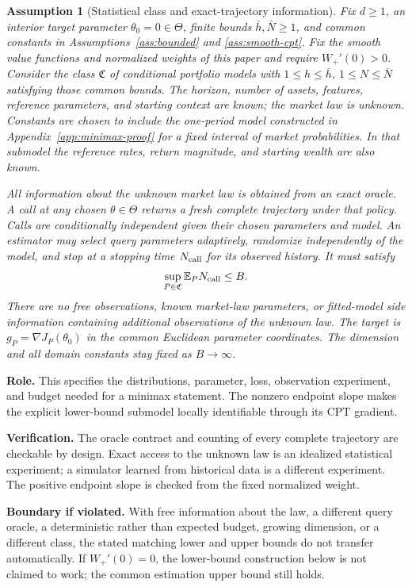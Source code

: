 \documentclass[11pt]{article}
\newtheorem{assumption}[theorem]{Assumption}
\newcommand{\E}{\mathbb E}
\newcommand{\1}{\mathbf 1}
\theoremstyle{definition}
\newcommand{\assess}[3]{\par\noindent\textbf{Role.} #1\par\noindent\textbf{Verification.} #2\par\noindent\textbf{Boundary if violated.} #3\par\medskip}
\begin{document}
\begin{assumption}[Statistical class and exact-trajectory information]\label{ass:oracle}
Fix $d\ge1$, an interior target parameter $\theta_0=0\in\Theta$, finite bounds $\bar h,\bar N\ge1$, and common constants in Assumptions~\ref{ass:bounded} and \ref{ass:smooth-cpt}. Fix the smooth value functions and normalized weights of this paper and require $W_+'(0)>0$. Consider the class $\mathfrak C$ of conditional portfolio models with $1\le h\le\bar h$, $1\le N\le\bar N$ satisfying those common bounds. The horizon, number of assets, features, reference parameters, and starting context are known; the market law is unknown. Constants are chosen to include the one-period model constructed in Appendix~\ref{app:minimax-proof} for a fixed interval of market probabilities. In that submodel the reference rates, return magnitude, and starting wealth are also known.

All information about the unknown market law is obtained from an exact oracle. A call at any chosen $\theta\in\Theta$ returns a fresh complete trajectory under that policy. Calls are conditionally independent given their chosen parameters and model. An estimator may select query parameters adaptively, randomize independently of the model, and stop at a stopping time $N_{\rm call}$ for its observed history. It must satisfy
\[
 \sup_{P\in\mathfrak C}\E_P N_{\rm call}\le B.
\]
There are no free observations, known market-law parameters, or fitted-model side information containing additional observations of the unknown law. The target is $g_P=\nabla J_P(\theta_0)$ in the common Euclidean parameter coordinates. The dimension and all domain constants stay fixed as $B\to\infty$.
\end{assumption}
\assess{This specifies the distributions, parameter, loss, observation experiment, and budget needed for a minimax statement. The nonzero endpoint slope makes the explicit lower-bound submodel locally identifiable through its CPT gradient.}{The oracle contract and counting of every complete trajectory are checkable by design. Exact access to the unknown law is an idealized statistical experiment; a simulator learned from historical data is a different experiment. The positive endpoint slope is checked from the fixed normalized weight.}{With free information about the law, a different query oracle, a deterministic rather than expected budget, growing dimension, or a different class, the stated matching lower and upper bounds do not transfer automatically. If $W_+'(0)=0$, the lower-bound construction below is not claimed to work; the common estimation upper bound still holds.}
\end{document}

